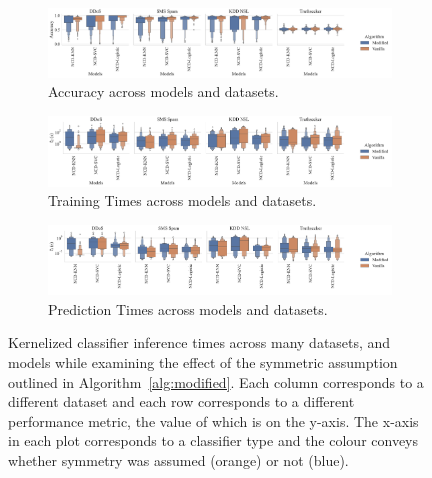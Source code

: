 \documentclass[conference]{IEEEtran}
\begin{document}
\begin{figure}[htb]
    \centering
    \begin{subfigure}[htb]{\textwidth}
        \includegraphics[width=\textwidth]{figs/combined/modified_models_vs_accuracy.pdf}
        \caption{Accuracy across models and datasets.}
        \label{fig:mod_acc}
    \end{subfigure}
    \begin{subfigure}[htb]{\textwidth}
        \centering
        \includegraphics[width=\textwidth]{figs/combined/modified_models_vs_train_time.pdf}
        \caption{Training Times across models and datasets.}
        \label{fig:mod_train_time}
    \end{subfigure}
    \begin{subfigure}[htb]{\textwidth}
        \includegraphics[width=\textwidth]{figs/combined/modified_models_vs_predict_time.pdf}
        \caption{Prediction Times across models and datasets.}
        \label{fig:mod_pred_time}
    \end{subfigure}
    \caption{Kernelized classifier inference times across many datasets, and models while examining the effect of the symmetric assumption outlined in Algorithm~\ref{alg:modified}. Each column corresponds to a different dataset and each row corresponds to a different performance metric, the value of which is on the y-axis. The x-axis in each plot corresponds to a classifier type and the colour conveys whether symmetry was assumed (orange) or not (blue).}
    \label{fig:mod_summary}
\end{figure}
\end{document}
